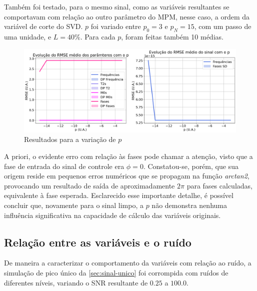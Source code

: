 \documentclass[12pt]{article}
\begin{document}
Também foi testado, para o mesmo sinal, como as variáveis resultantes se comportavam com relação ao outro parâmetro do MPM, nesse caso, a 
ordem da variável de corte do SVD. $p$ foi variado entre $p_0 = 3$ e $p_N = 15$, com um passo de uma unidade, e $L = 40\%$. Para cada $p$, foram feitas 
também 10 médias. 

\begin{figure} [H]
    \centering
    \includegraphics[scale=0.4166]{RMSE-p.png}
    \caption{Resultados para a variação de $p$}
    \label{fig:4}
\end{figure}

A priori, o evidente erro com relação às fases pode chamar a atenção, visto que a fase de entrada do sinal de controle era $\phi = 0$.
Constatou-se, porém, que sua origem reside em pequenos erros numéricos que se propagam na função \textit{arctan2}, provocando um resultado 
de saída de aproximadamente $2\pi$ para fases calculadas, equivalente à fase esperada. Esclarecido esse importante detalhe, é possível concluir
que, novamente para o sinal limpo, a $p$ não demonstra nenhuma influência significativa na capacidade de cálculo das variáveis originais.

\subsection{Relação entre as variáveis e o ruído}

De maneira a caracterizar o comportamento da variáveis com relação ao ruído, a simulação de pico único da \autoref{sec:sinal-unico} foi corrompida com
ruídos de diferentes níveis, variando o SNR resultante de $0.25$ a $100.0$. 
\end{document}
